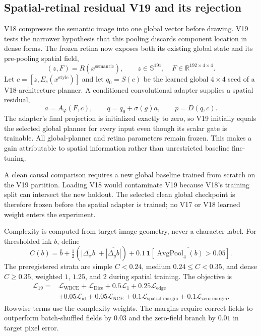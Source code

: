 \documentclass[11pt]{article}
\begin{document}
\subsection{Spatial-retinal residual V19 and its rejection}

V18 compresses the semantic image into one global vector before drawing. V19
tests the narrower hypothesis that this pooling discards component location in
dense forms. The frozen retina now exposes both its existing global state and
its pre-pooling spatial field,
\[
(z,F)=R(x^{\mathrm{semantic}}),\qquad
z\in\mathbb S^{191},\quad F\in\mathbb R^{192\times4\times4}.
\]
Let $c=[z,E_s(x^{\mathrm{style}})]$ and let $q_0=S(c)$ be the learned global
$4\times4$ seed of a V18-architecture planner. A conditioned convolutional
adapter supplies a spatial residual,
\[
a=A_\varphi(F,c),\qquad
q=q_0+\sigma(g)a,\qquad
p=D(q,c).
\]
The adapter's final projection is initialized exactly to zero, so V19 initially
equals the selected global planner for every input even though its scalar gate
is trainable. All global-planner and retina parameters remain frozen. This
makes a gain attributable to spatial information rather than unrestricted
baseline fine-tuning.

A clean causal comparison requires a new global baseline trained from scratch
on the V19 partition. Loading V18 would contaminate V19 because V18's training
split can intersect the new holdout. The selected clean global checkpoint is
therefore frozen before the spatial adapter is trained; no V17 or V18 learned
weight enters the experiment.

Complexity is computed from target image geometry, never a character label. For
thresholded ink $b$, define
\[
C(b)=\overline b+\tfrac12
\left(\overline{|\Delta_x b|}+\overline{|\Delta_y b|}\right)
+0.1\,\overline{\mathbf 1[\operatorname{AvgPool}_4(b)>0.05]}.
\]
The preregistered strata are simple $C<0.24$, medium
$0.24\le C<0.35$, and dense $C\ge0.35$, weighted $1$, $1.25$, and $2$ during
spatial training. The objective is
\[
\begin{aligned}
\mathcal L_{19}={}&
\mathcal L_{\mathrm{WBCE}}+
\mathcal L_{\mathrm{Dice}}+0.5\mathcal L_{1}
+0.25\mathcal L_{\mathrm{edge}}\\
&+0.05\mathcal L_{\mathrm{id}}+0.05\mathcal L_{\mathrm{NCE}}
+0.1\mathcal L_{\mathrm{spatial\text{-}margin}}
+0.1\mathcal L_{\mathrm{zero\text{-}margin}}.
\end{aligned}
\]
Rowwise terms use the complexity weights. The margins require correct fields to
outperform batch-shuffled fields by $0.03$ and the zero-field branch by $0.01$
in target pixel error.
\end{document}
